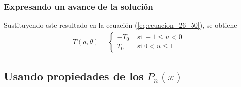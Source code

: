 \documentclass[12pt]{beamer}
\begin{document}
\begin{frame}
\frametitle{Expresando un avance de la solución}
Sustituyendo este resultado en la ecuación (\ref{eq:ecuacion_26_50}), se obtiene
\begin{align}
T (a, \theta) = \begin{cases}
- T_{0}  & \mbox{ si } -1 \leq u < 0 \\[1em]
T_{0} & \mbox{ si } 0 < u \leq 1 
\end{cases} 
\label{eq:ecuacion_26_51}
\end{align}
\end{frame}

\subsection{Usando propiedades de los \texorpdfstring{$P_{n}(x)$}{Pn(x)}}
\end{document}

